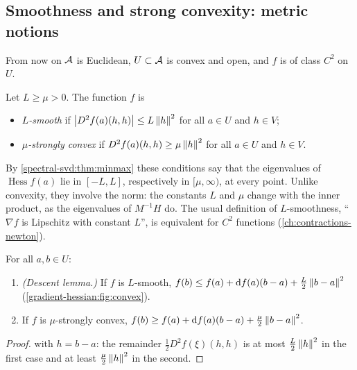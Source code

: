 \begin{notechapter}
\subsection{Smoothness and strong convexity: metric notions}

From now on $\mathcal{A}$ is Euclidean, $U\subset\mathcal{A}$ is convex and open, and
$f$ is of class $C^2$ on $U$.

\begin{definition}\label{gradient-hessian:def:smooth}
Let $L\geq\mu > 0$. The function $f$ is
\begin{itemize}[nosep]
  \item \emph{$L$-smooth} if $\left|D^2f(a)(h, h)\right|\leq L\left\|h\right\|^2$ for all
        $a\in U$ and $h\in V$;
  \item \emph{$\mu$-strongly convex} if $D^2f(a)(h, h)\geq\mu\left\|h\right\|^2$
        for all $a\in U$ and $h\in V$.
\end{itemize}
\end{definition}

By \cref{spectral-svd:thm:minmax} these conditions say that the
eigenvalues of $\operatorname{Hess}f(a)$ lie in $[-L, L]$, respectively in
$[\mu, \infty)$, at every point. Unlike convexity, they involve the norm:
the constants $L$ and $\mu$ change with the inner product, as the
eigenvalues of $M^{-1}H$ do. The usual definition of $L$-smoothness,
``$\nabla f$ is Lipschitz with constant $L$'', is equivalent for $C^2$
functions (\cref{ch:contractions-newton}).

\begin{proposition}\label{gradient-hessian:prop:bounds}
For all $a, b\in U$:
\begin{enumerate}[nosep]
  \item \emph{(Descent lemma.)} If $f$ is $L$-smooth,
        $f(b)\leq f(a) + \mathrm{d} f(a)(b - a) + \frac L2\left\|b - a\right\|^2$
        (\cref{gradient-hessian:fig:convex}).
  \item If $f$ is $\mu$-strongly convex,
        $f(b)\geq f(a) + \mathrm{d} f(a)(b - a) + \frac\mu2\left\|b - a\right\|^2$.
\end{enumerate}
\end{proposition}

\begin{proof}
 with $h = b - a$: the remainder
$\frac12D^2f(\xi)(h, h)$ is at most $\frac L2\left\|h\right\|^2$ in the first case
and at least $\frac\mu2\left\|h\right\|^2$ in the second.
\end{proof}


\end{notechapter}

